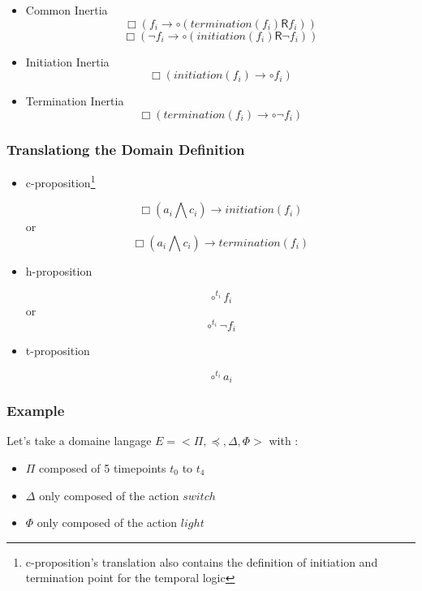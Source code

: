 \begin{itemize}
  \item Common Inertia
  $$\Box(f_i\rightarrow\circ (termination(f_i) \mathbin{\bm{\mathsf{R}}} f_i))$$
  $$\Box(\neg f_i\rightarrow\circ (initiation(f_i) \mathbin{\bm{\mathsf{R}}} \neg f_i))$$
  \item Initiation Inertia $$\Box(initiation(f_i)\rightarrow\circ f_i)$$
  \item Termination Inertia $$\Box(termination(f_i)\rightarrow\circ \neg f_i)$$
\end{itemize}

\subsubsection{Translationg the Domain Definition}

\begin{itemize}
  \item c-proposition\footnote{c-proposition's translation also contains the definition of initiation and termination point for the temporal logic}

  $$\Box(a_i\bigwedge c_i)\rightarrow initiation(f_i)$$ or $$\Box(a_i\bigwedge c_i)\rightarrow termination(f_i)$$
  \item h-proposition

  $$\circ^{t_i}f_i$$ or $$\circ^{t_i} \neg f_i$$
  \item t-proposition

  $$\circ^{t_i}a_i$$
\end{itemize}

\subsubsection{Example}

Let's take a domaine langage $E=<\Pi,\preceq,\Delta,\Phi>$ with :
\begin{itemize}
  \item $\Pi$ composed of 5 timepoints $t_0$ to $t_4$
  \item $\Delta$ only composed of the action $switch$
  \item $\Phi$ only composed of the action $light$
\end{itemize}


